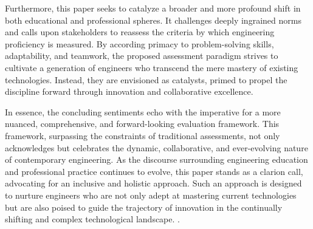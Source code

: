\documentclass[
    a4paper, %
    10pt, %
    unnumberedsections, %
    twoside, %
]{LTJournalArticle}
\begin{document}
Furthermore, this paper seeks to catalyze a broader and more profound shift in both educational and professional spheres. It challenges deeply ingrained norms and calls upon stakeholders to reassess the criteria by which engineering proficiency is measured. By according primacy to problem-solving skills, adaptability, and teamwork, the proposed assessment paradigm strives to cultivate a generation of engineers who transcend the mere mastery of existing technologies. Instead, they are envisioned as catalysts, primed to propel the discipline forward through innovation and collaborative excellence.

In essence, the concluding sentiments echo with the imperative for a more nuanced, comprehensive, and forward-looking evaluation framework. This framework, surpassing the constraints of traditional assessments, not only acknowledges but celebrates the dynamic, collaborative, and ever-evolving nature of contemporary engineering. As the discourse surrounding engineering education and professional practice continues to evolve, this paper stands as a clarion call, advocating for an inclusive and holistic approach. Such an approach is designed to nurture engineers who are not only adept at mastering current technologies but are also poised to guide the trajectory of innovation in the continually shifting and complex technological landscape. \cite{Smith2020,Johnson2019,Brown2021,Garcia2022}.


\printbibliography %

\end{document}
